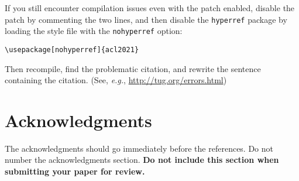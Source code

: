 \documentclass[11pt,a4paper]{article}
\begin{document}
	If you still encounter compilation issues even with the patch enabled, disable the patch by commenting the two lines, and then disable the \texttt{\small hyperref} package by loading the style file with the \texttt{\small nohyperref} option:
	
	\noindent
	{\small\verb|\usepackage[nohyperref]{acl2021}|}
	
	\noindent
	Then recompile, find the problematic citation, and rewrite the sentence containing the citation. (See, {\em e.g.}, \url{http://tug.org/errors.html})
	
	\section*{Acknowledgments}
	
	The acknowledgments should go immediately before the references. Do not number the acknowledgments section.
	\textbf{Do not include this section when submitting your paper for review.}
	
	
	
	
	
	
	
\end{document}
